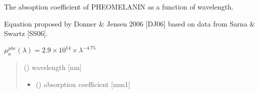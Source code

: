 \documentclass[letterpaper,10pt,english]{sphinxmanual}
\begin{document}

\begin{fulllineitems}
\label{\detokenize{03_absorption_coefficient:skinoptics.absorption_coefficient.mua_phe_Donner}}
\pysigstartsignatures
{}
\pysigstopsignatures
\begin{DUlineblock}{0em}
\item[] The absoption coefficient of PHEOMELANIN as a function of wavelength.
\item[] Equation proposed by Donner \& Jensen 2006 {[}DJ06{]} based on data from Sarna \& Swartz {[}SS06{]}.
\end{DUlineblock}

\sphinxAtStartPar
\(\mu_a^{phe} (\lambda) = 2.9 \times 10^{14} \times \lambda^{-4.75}\)
\begin{quote}\begin{description}
\sphinxAtStartPar
{} () \textendash{} wavelength {[}nm{]}

\begin{itemize}
\item {} 
\sphinxAtStartPar
{} () \textendash{} absorption coefficient {[}mm\sphinxhyphen{}1{]}

\end{itemize}

\end{description}\end{quote}

\end{fulllineitems}

\end{document}
